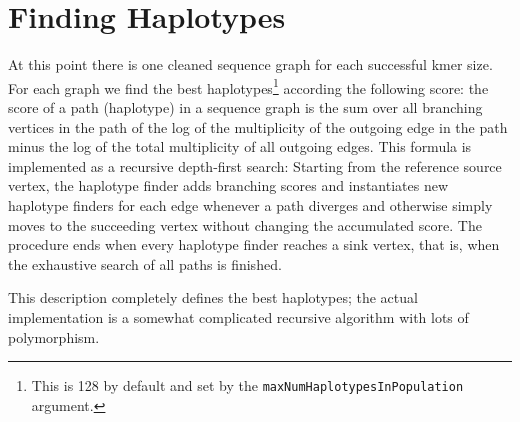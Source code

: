 \documentclass[nofootinbib,amssymb,amsmath]{revtex4}
\newcommand{\code}[1]{\texttt{#1}}
\begin{document}
\section{Finding Haplotypes} \label{finding-haplotypes}
At this point there is one cleaned sequence graph for each successful kmer size.  For each graph we find the best haplotypes\footnote{This is 128 by default and set by the \code{maxNumHaplotypesInPopulation} argument.} according the following score: the score of a path (haplotype) in a sequence graph is the sum over all branching vertices in the path of the log of the multiplicity of the outgoing edge in the path minus the log of the total multiplicity of all outgoing edges.  This formula is implemented as a recursive depth-first search: Starting from the reference source vertex, the haplotype finder adds branching scores and instantiates new haplotype finders for each edge whenever a path diverges and otherwise simply moves to the succeeding vertex without changing the accumulated score.  The procedure ends when every haplotype finder reaches a sink vertex, that is, when the exhaustive search of all paths is finished.


This description completely defines the best haplotypes; the actual implementation is a somewhat complicated recursive algorithm with lots of polymorphism.
\end{document}
